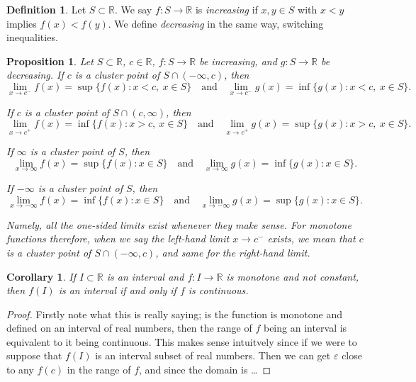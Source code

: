 \documentclass{article}
\newtheorem{corollary}{Corollary}[section]
\newtheorem{proposition}{Proposition}[section]
\theoremstyle{definition}
\newtheorem{definition}{Definition}[section]
\theoremstyle{remark}
\begin{document}
\vspace{.5cm}


\begin{definition}
Let $S \subset \mathbb{R}$. We say $f: S \to \mathbb{R}$ is \emph{increasing} if 
$x,y \in S$ with $x < y$ implies $f(x) < f(y)$. We define \emph{decreasing} in the same way, switching inequalities.
\end{definition}


\vspace{.5cm}


\begin{proposition}
Let $S \subset \mathbb{R}$, $c \in \mathbb{R}$, $f : S \to \mathbb{R}$ be increasing, and $g : S \to \mathbb{R}$ be decreasing. If $c$ is a cluster point of $S \cap (-\infty, c)$, then
\[
\lim_{x \to c^-} f(x) = \sup\{f(x) : x < c,\ x \in S\}
\quad \text{and} \quad
\lim_{x \to c^-} g(x) = \inf\{g(x) : x < c,\ x \in S\}.
\]

If $c$ is a cluster point of $S \cap (c, \infty)$, then
\[
\lim_{x \to c^+} f(x) = \inf\{f(x) : x > c,\ x \in S\}
\quad \text{and} \quad
\lim_{x \to c^+} g(x) = \sup\{g(x) : x > c,\ x \in S\}.
\]

If $\infty$ is a cluster point of $S$, then
\[
\lim_{x \to \infty} f(x) = \sup\{f(x) : x \in S\}
\quad \text{and} \quad
\lim_{x \to \infty} g(x) = \inf\{g(x) : x \in S\}.
\]

If $-\infty$ is a cluster point of $S$, then
\[
\lim_{x \to -\infty} f(x) = \inf\{f(x) : x \in S\}
\quad \text{and} \quad
\lim_{x \to -\infty} g(x) = \sup\{g(x) : x \in S\}.
\]

Namely, all the one-sided limits exist whenever they make sense. For monotone functions therefore, when we say the left-hand limit $x \to c^-$ exists, we mean that $c$ is a cluster point of $S \cap (-\infty, c)$, and same for the right-hand limit.
\end{proposition}



\vspace{.5cm}


\begin{corollary}
If $I \subset \mathbb{R}$ is an interval and $f : I \to \mathbb{R}$ is monotone and not constant, then $f(I)$ is an interval if and only if $f$ is continuous.
\end{corollary}

\begin{proof}
Firstly note what this is really saying; is the function 
is monotone and defined on an interval of real numbers, then
the range of $f$ being an interval is equivalent to it being continuous. 
This makes sense intuitvely since if we were to suppose that $f(I)$ is 
an interval subset of real numbers. Then we can get $\varepsilon$ close 
to any $f(c)$ in the range of $f$, and since the domain is \dots 
\end{proof}
\end{document}

